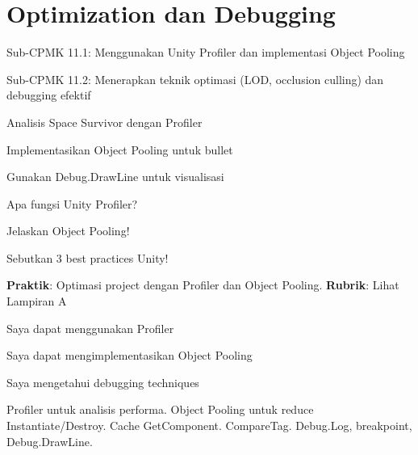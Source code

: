 \documentclass[../main]{subfiles}
\begin{document}
\chapter{Optimization dan Debugging}

\begin{subcpmk}
  \item Sub-CPMK 11.1: Menggunakan Unity Profiler dan implementasi Object Pooling
  \item Sub-CPMK 11.2: Menerapkan teknik optimasi (LOD, occlusion culling) dan debugging efektif
\end{subcpmk}




\begin{aktivitas}
  \item Analisis Space Survivor dengan Profiler
  \item Implementasikan Object Pooling untuk bullet
  \item Gunakan Debug.DrawLine untuk visualisasi
\end{aktivitas}

\begin{latihan}
  \item Apa fungsi Unity Profiler?
  \item Jelaskan Object Pooling!
  \item Sebutkan 3 best practices Unity!
\end{latihan}

\begin{asesmen}
\textbf{Praktik}: Optimasi project dengan Profiler dan Object Pooling.
\textbf{Rubrik}: Lihat Lampiran A
\end{asesmen}

\begin{checklist}
  \item Saya dapat menggunakan Profiler
  \item Saya dapat mengimplementasikan Object Pooling
  \item Saya mengetahui debugging techniques
\end{checklist}

\begin{rangkuman}
Profiler untuk analisis performa. Object Pooling untuk reduce Instantiate/Destroy. Cache GetComponent. CompareTag. Debug.Log, breakpoint, Debug.DrawLine.
\end{rangkuman}

\ifSubfilesClassLoaded{
  \renewcommand{\bibname}{Daftar Pustaka}
  
  
}{}
\end{document}
